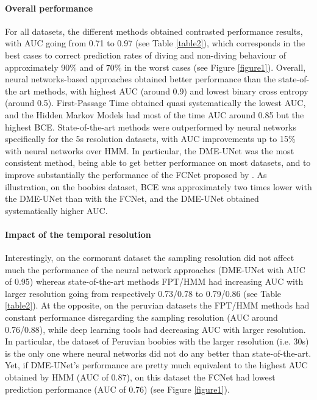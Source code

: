 \documentclass{article}
\begin{document}
\paragraph{Overall performance}
For all datasets, the different methods obtained contrasted performance results, with AUC going from 0.71 to 0.97 (see Table \ref{table2}), which corresponds in the best cases to correct prediction rates of diving and non-diving behaviour of approximately 90\% and of 70\% in the worst cases (see Figure \ref{figure1}). Overall, neural networks-based approaches obtained better performance than the state-of-the art methods, with highest AUC (around 0.9) and lowest binary cross entropy (around 0.5). First-Passage Time obtained quasi systematically the lowest AUC, and the Hidden Markov Models had most of the time AUC around 0.85 but the highest BCE. State-of-the-art methods were outperformed by neural networks specifically for the 5s resolution datasets, with AUC improvements up to 15\% with neural networks over HMM. In particular, the DME-UNet was the most consistent method, being able to get better performance on most datasets, and to improve substantially the performance of the FCNet proposed by \citep{browning_predicting_2018}. As illustration, on the boobies dataset, BCE was approximately two times lower with the DME-UNet than with the FCNet, and the DME-UNet obtained systematically higher AUC.

\paragraph{Impact of the temporal resolution}
Interestingly, on the cormorant dataset the sampling resolution did not affect much the performance of the neural network approaches (DME-UNet with AUC of 0.95) whereas state-of-the-art methods FPT/HMM had increasing AUC with larger resolution going from respectively 0.73/0.78 to 0.79/0.86 (see Table \ref{table2}).
At the opposite, on the peruvian datasets the FPT/HMM methods had constant performance disregarding the sampling resolution (AUC around 0.76/0.88), while deep learning tools had decreasing AUC with larger resolution. In particular, the dataset of Peruvian boobies with the larger resolution (i.e. 30s) is the only one where neural networks did not do any better than state-of-the-art. Yet, if DME-UNet's performance are pretty much equivalent to the highest AUC obtained by HMM (AUC of 0.87), on this dataset the FCNet had lowest prediction performance (AUC of 0.76) (see Figure \ref{figure1}).
\end{document}

